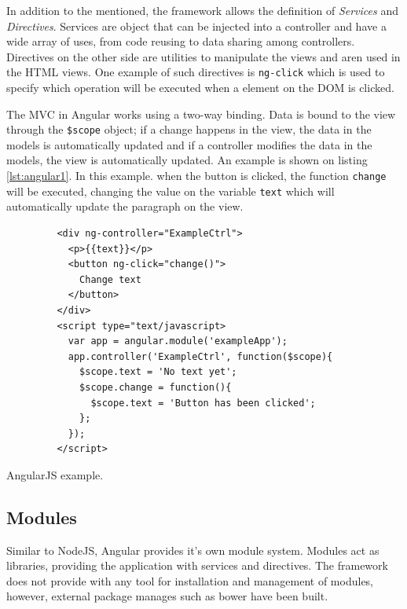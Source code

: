 In addition to the mentioned, the framework allows the definition of \textit{Services} and \textit{Directives}. Services are object that can be injected into a controller and have a wide array of uses, from code reusing to data sharing among controllers. Directives on the other side are utilities to manipulate the views and aren  used in the HTML views. One example of such directives is \texttt{ng-click} which is used to specify which operation will be executed when a element on the DOM is clicked.

The MVC in Angular works using a two-way binding. Data is bound to the view through the \texttt{\$scope} object; if a change happens in the view, the data in the models is automatically updated and if a controller modifies the data in the models, the view is automatically updated. An example is shown on listing \ref{lst:angular1}. In this example. when the button is clicked, the function \texttt{change} will be executed, changing the value on the variable \texttt{text} which will automatically update the paragraph on the view.

\begin{listing}\centering
  \begin{minipage}{.6\textwidth}
    \begin{verbatim}
	     <div ng-controller="ExampleCtrl">
	       <p>{{text}}</p>
	       <button ng-click="change()"> 
	         Change text 
	       </button>
	     </div>
	     <script type="text/javascript>
	       var app = angular.module('exampleApp');
	       app.controller('ExampleCtrl', function($scope){
	         $scope.text = 'No text yet';
	         $scope.change = function(){
	           $scope.text = 'Button has been clicked';
	         };
	       });
	     </script>
    \end{verbatim}
  \end{minipage}
  \caption{AngularJS example.}\label{lst:angular1}
\end{listing}

\subsection*{Modules}

Similar to NodeJS, Angular provides it's own module system. Modules act as libraries, providing the application with services and directives. The framework does not provide with any tool for installation and management of modules, however, external package manages such as bower\cite{bower} have been built.

